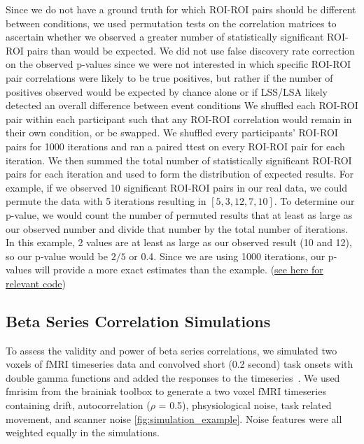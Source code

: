 \documentclass[10pt,letterpaper]{article}
\begin{document}
Since we do not have a ground truth for which ROI-ROI pairs should be different between conditions,
we used permutation tests on the correlation matrices to ascertain whether we observed a greater number
of statistically significant ROI-ROI pairs than would be expected.
We did not use false discovery rate correction on the observed p-values since we were not interested in
which specific ROI-ROI pair correlations were likely to be true positives, but rather if the number of positives
observed would be expected by chance alone or if LSS/LSA likely detected an overall difference between event conditions
We shuffled each ROI-ROI pair within each participant such that any ROI-ROI correlation would remain
in their own condition, or be swapped.
We shuffled every participants' ROI-ROI pairs for 1000 iterations and ran a paired ttest on every ROI-ROI pair
for each iteration.
We then summed the total number of statistically significant ROI-ROI pairs for each iteration and used
to form the distribution of expected results.
For example, if we observed 10 significant ROI-ROI pairs in our real data, we could permute the data
with 5 iterations resulting in $[5, 3, 12, 7, 10]$.
To determine our p-value, we would count the number of permuted results that at least as large as
our observed number and divide that number by the total number of iterations.
In this example, 2 values are at least as large as our observed result (10 and 12), so our
p-value would be $2/5$ or 0.4.
Since we are using 1000 iterations, our p-values will provide a more exact estimates than the example.
(\href{https://github.com/jdkent/BetaSeriesRealDataAnalysis/blob/90fafb5b83b2e1bfade61a9fb1a87f225efaa95f/nibsAnalysis/BetaSeriesAnalysis.ipynb}{see here for relevant code})

\subsection*{Beta Series Correlation Simulations}
\label{methods:bsc-simulations}

To assess the validity and power of beta series correlations,
we simulated two voxels of fMRI timeseries data and convolved short (0.2 second)
task onsets with double gamma functions
and added the responses to the timeseries~\cite{Glover1999,Welvaert2011}.
We used fmrisim from the brainiak toolbox\cite{Ellis2020} to generate a
two voxel fMRI timeseries containing drift, autocorrelation ($\rho$ = 0.5), phsysiological noise,
task related movement, and scanner noise \ref{fig:simulation_example}.
Noise features were all weighted equally in the simulations.
\end{document}
